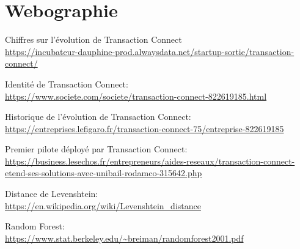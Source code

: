 \section{Webographie}
Chiffres sur l’évolution de Transaction Connect\\
\url{https://incubateur-dauphine-prod.alwaysdata.net/startup-sortie/transaction-connect/}


Identité de Transaction Connect:\\
\url{https://www.societe.com/societe/transaction-connect-822619185.html}


Historique de l’évolution de Transaction Connect:\\
\url{https://entreprises.lefigaro.fr/transaction-connect-75/entreprise-822619185}


Premier pilote déployé par Transaction Connect:\\
\url{https://business.lesechos.fr/entrepreneurs/aides-reseaux/transaction-connect-etend-ses-solutions-avec-unibail-rodamco-315642.php}


 Distance de Levenshtein: \\
\url{https://en.wikipedia.org/wiki/Levenshtein_distance}


Random Forest:\\
\url{https://www.stat.berkeley.edu/~breiman/randomforest2001.pdf}
